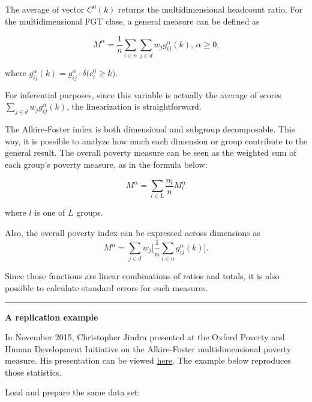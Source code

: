 \documentclass[]{book}
\theoremstyle{definition}
\theoremstyle{definition}
\theoremstyle{remark}
\begin{document}
The average of vector \(C^0 (k)\) returns the multidimensional headcount
ratio. For the multidimensional FGT class, a general measure can be
defined as

\[
M^\alpha = \frac{1}{n} \sum_{i \in n} \sum_{j \in d} w_j g_{ij}^{\alpha}(k) \text{, } \alpha \geq 0 \text{,}
\]

where
\(g_{ij}^{\alpha}(k) = g_{ij}^\alpha \cdot \delta \big( c^0_i \geqslant k \big)\).

For inferential purposes, since this variable is actually the average of
scores \(\sum_{j \in d} w_j g_{ij}^{\alpha}(k)\), the linearization is
straightforward.

The Alkire-Foster index is both dimensional and subgroup decomposable.
This way, it is possible to analyze how much each dimension or group
contribute to the general result. The overall poverty measure can be
seen as the weighted sum of each group's poverty measure, as in the
formula below:

\[
M^\alpha = \sum_{l \in L} \frac{ n_l }{ n } M^\alpha_{l}
\]

where \(l\) is one of \(L\) groups.

Also, the overall poverty index can be expressed across dimensions as \[
M^\alpha = \sum_{j \in d} w_j \bigg[ \frac{1}{n} \sum_{i \in n} g_{ij}^\alpha (k) \bigg] \text{.}
\]

Since those functions are linear combinations of ratios and totals, it
is also possible to calculate standard errors for such measures.

\begin{center}\rule{0.5\linewidth}{\linethickness}\end{center}

\textbf{A replication example}

In November 2015, Christopher Jindra presented at the Oxford Poverty and
Human Development Initiative on the Alkire-Foster multidimensional
poverty measure. His presentation can be viewed
\href{http://www.ophi.org.uk/wp-content/uploads/Jindra_151109_OPHISeminar.pdf}{here}.
The example below reproduces those statistics.

Load and prepare the same data set:
\end{document}

